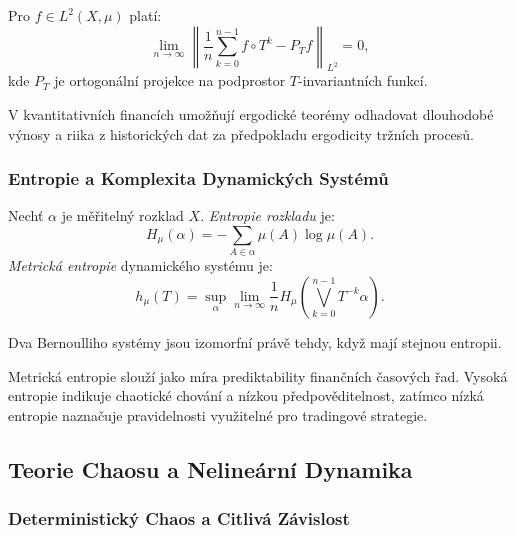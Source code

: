 \begin{theorem}
Pro $f \in L^2(X, \mu)$ platí:
\[
\lim_{n \to \infty} \left\| \frac{1}{n} \sum_{k=0}^{n-1} f \circ T^k - P_T f \right\|_{L^2} = 0,
\]
kde $P_T$ je ortogonální projekce na podprostor $T$-invariantních funkcí.
\end{theorem}

\begin{application}
V kvantitativních financích umožňují ergodické teorémy odhadovat dlouhodobé výnosy a riika z historických dat za předpokladu ergodicity tržních procesů.
\end{application}

\subsubsection{Entropie a Komplexita Dynamických Systémů}

\begin{definition}
Nechť $\alpha$ je měřitelný rozklad $X$. \emph{Entropie rozkladu} je:
\[
H_\mu(\alpha) = -\sum_{A \in \alpha} \mu(A) \log \mu(A).
\]
\emph{Metrická entropie} dynamického systému je:
\[
h_\mu(T) = \sup_{\alpha} \lim_{n \to \infty} \frac{1}{n} H_\mu\left( \bigvee_{k=0}^{n-1} T^{-k} \alpha \right).
\]
\end{definition}

\begin{theorem}
Dva Bernoulliho systémy jsou izomorfní právě tehdy, když mají stejnou entropii.
\end{theorem}

\begin{application}
Metrická entropie slouží jako míra prediktability finančních časových řad. Vysoká entropie indikuje chaotické chování a nízkou předpověditelnost, zatímco nízká entropie naznačuje pravidelnosti využitelné pro tradingové strategie.
\end{application}

\spc

\subsection{Teorie Chaosu a Nelineární Dynamika}

\subsubsection{Deterministický Chaos a Citlivá Závislost}

